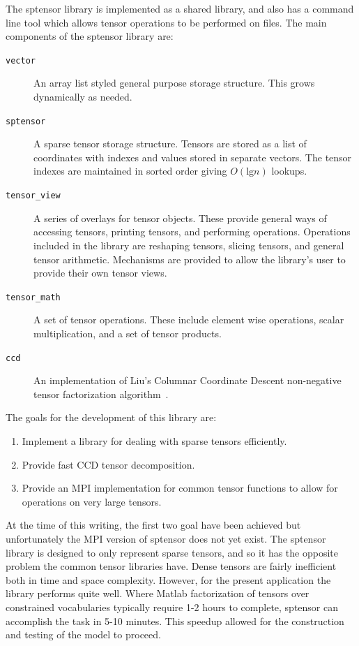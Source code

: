 \documentclass[../ut-dissertation.tex]{subfiles}
\begin{document}
The sptensor library is implemented as a shared library, and also has a
command line tool which allows tensor operations to be performed on
files.  The main components of the sptensor library are:
\begin{description}
\item[{\tt vector}] An array list styled general purpose storage structure.
  This grows dynamically as needed.
\item[{\tt sptensor}] A sparse tensor storage structure.  Tensors are stored
  as a list of coordinates with indexes and values stored in separate
  vectors.  The tensor indexes are maintained in sorted order giving
  $O(\mathrm{lg} n)$ lookups.
\item[{\tt tensor\_view}] A series of overlays for tensor objects.  These
  provide general ways of accessing tensors, printing tensors, and
  performing operations.  Operations included in the library are
  reshaping tensors, slicing tensors, and general tensor arithmetic.
  Mechanisms are provided to allow the library's user to provide their
  own tensor views.
\item[{\tt tensor\_math}] A set of tensor operations.  These include
  element wise operations, scalar multiplication, and a set of tensor
  products.
\item[{\tt ccd}] An implementation of Liu's Columnar Coordinate
  Descent non-negative tensor factorization algorithm~\cite{liu2012sparse}.
\end{description}

The goals for the development of this library are:
\begin{enumerate}
  \item Implement a library for dealing with sparse tensors
    efficiently.
  \item Provide fast CCD tensor decomposition.
  \item Provide an MPI implementation for common tensor functions to
    allow for operations on very large tensors.
\end{enumerate}
At the time of this writing, the first two goal have been achieved but
unfortunately the MPI version of sptensor does not yet exist.  The
sptensor library is designed to only represent sparse tensors, and so
it has the opposite problem the common tensor libraries have.  Dense
tensors are fairly inefficient both in time and space complexity.
However, for the present application the library performs quite well.
Where Matlab factorization of tensors over constrained vocabularies
typically require 1-2 hours to complete, sptensor can accomplish the
task in 5-10 minutes.  This speedup allowed for the construction and
testing of the model to proceed.
\end{document}
